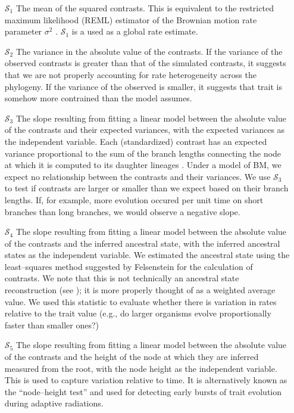 \documentclass[a4paper,12pt]{article}
\begin{document}
\begin{enumerate}
\item[$\mathcal{S}_1$] The mean of the squared contrasts. This is equivalent to the restricted maximum likelihood (REML) estimator of the Brownian motion rate parameter $\sigma^2$ \citep{Garland1992, Rohlf2001}. $\mathcal{S}_1$ is a used as a global rate estimate.

\item[$\mathcal{S}_2$] The variance in the absolute value of the contrasts. If the variance of the observed contrasts is greater than that of the simulated contrasts, it suggests that we are not properly accounting for rate heterogeneity across the phylogeny. If the variance of the observed is smaller, it suggests that trait is somehow more contrained than the model assumes.

\item[$\mathcal{S}_3$] The slope resulting from fitting a linear model between the absolute value of the contrasts and their expected variances, with the expected variances as the independent variable. Each (standardized) contrast has an expected variance proportional to the sum of the branch lengths connecting the node at which it is computed to its daughter lineages  \citep{Felsenstein1985}. Under a model of BM, we expect no relationship between the contrasts and their variances. We use $\mathcal{S}_3$ to test if contrasts are larger or smaller than we expect based on their branch lengths. If, for example, more evolution occured per unit time on short branches than long branches, we would observe a negative slope.

\item[$\mathcal{S}_4$] The slope resulting from fitting a linear model between the absolute value of the contrasts and the inferred ancestral state, with the inferred ancestral states as the independent variable. We estimated the ancestral state using the least--squares method suggested by Felsenstein \citep{Felsenstein1985} for the calculation of contrasts. We note that this is not technically an ancestral state reconstruction (see \citep{Felsenstein1985}); it is more properly thought of as a weighted average value. We used this statistic to evaluate whether there is variation in rates relative to the trait value (e.g., do larger organisms evolve proportionally faster than smaller ones?)

\item[$\mathcal{S}_5$] The slope resulting from fitting a linear model between the absolute value of the contrasts and the height of the node at which they are inferred measured from the root, with the node height as the independent variable. This is used to capture variation relative to time. It is alternatively known as the ``node--height test'' \citep{FreckletonHarvey2006, SlaterPennell} and used for detecting early bursts of trait evolution during adaptive radiations. 


\end{enumerate}
\end{document}
